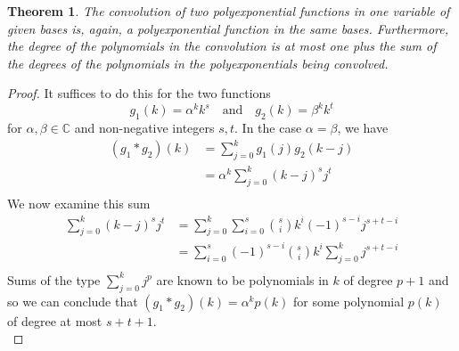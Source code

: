 \documentclass{memo-l}
\theoremstyle{plain}
\theoremstyle{definition}
\numberwithin{section}{chapter}
\numberwithin{equation}{chapter}
\theoremstyle{plain}
\newtheorem{thm}[theorem]{Theorem}
\theoremstyle{definition}
\newcommand\CC{\mathbb{C}}
\begin{document}
\begin{thm}\label{thm:conv_polyexponential} The convolution of two
\gls{polyexponential} functions in one variable of given bases is, again, 
a polyexponential function in the same bases.
Furthermore, the degree of the polynomials in the convolution is
at most one plus the sum of the degrees of the polynomials in the
polyexponentials being convolved.
\end{thm} 
\begin{proof} It
suffices to do this for the two functions
\begin{equation}\label{eq:convolution_cases}
g_1(k) =
\alpha^kk^s \quad \text{and} \quad g_2(k) = \beta^kk^t  
\end{equation}
for \( \alpha, \beta \in \CC\) and non-negative
integers \(s,t\). 
In the case \( \alpha = \beta \), we have \begin{align*}
(g_1 \ast g_2)(k) &= \sum_{j=0}^k g_1(j)g_2(k-j) \\ &= \alpha^k
\sum_{j=0}^k (k-j)^s j^t \\ \end{align*} We now examine this sum
\begin{align*} \sum_{j=0}^k (k-j)^s j^t &= \sum_{j=0}^k \sum_{i=0}^s
\binom{s}{i} k^i (-1)^{s-i} j^{s+t-i} \\ &= \sum_{i=0}^s (-1)^{s-i}
\binom{s}{i} k^i \sum_{j=0}^k j^{s+t-i} \\ \end{align*} Sums of the type \(
\sum_{j=0}^k j^p \) are known to be polynomials in \(k\) of degree \(p+1\)
and so we can conclude that \( (g_1 \ast g_2)(k) = \alpha^k p(k) \) for
some polynomial \(p(k)\) of degree at most \(s+t+1\).\\


\end{proof}
\end{document}
